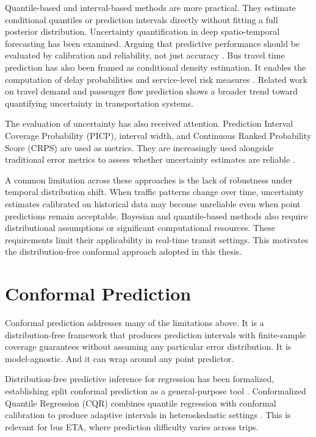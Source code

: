 \documentclass[12pt, a4paper, oneside]{report}
\begin{document}
Quantile-based and interval-based methods are more practical. They estimate conditional quantiles or prediction intervals directly without fitting a full posterior distribution. Uncertainty quantification in deep spatio-temporal forecasting has been examined. Arguing that predictive performance should be evaluated by calibration and reliability, not just accuracy \cite{Wu20211841}. Bus travel time prediction has also been framed as conditional density estimation. It enables the computation of delay probabilities and service-level risk measures \cite{Ricard2022}. Related work on travel demand \cite{Peng2025} and passenger flow prediction \cite{Mu2025118} shows a broader trend toward quantifying uncertainty in transportation systems.

The evaluation of uncertainty has also received attention. Prediction Interval Coverage Probability (PICP), interval width, and Continuous Ranked Probability Score (CRPS) are used as metrics. They are increasingly used alongside traditional error metrics to assess whether uncertainty estimates are reliable \cite{Wu20211841, Zhang2024139789}.

A common limitation across these approaches is the lack of robustness under temporal distribution shift. When traffic patterns change over time, uncertainty estimates calibrated on historical data may become unreliable even when point predictions remain acceptable. Bayesian and quantile-based methods also require distributional assumptions or significant computational resources. These requirements limit their applicability in real-time transit settings. This motivates the distribution-free conformal approach adopted in this thesis.

\section{Conformal Prediction}

Conformal prediction addresses many of the limitations above. It is a distribution-free framework that produces prediction intervals with finite-sample coverage guarantees without assuming any particular error distribution. It is model-agnostic. And it can wrap around any point predictor.

Distribution-free predictive inference for regression has been formalized, establishing split conformal prediction as a general-purpose tool \cite{Lei20181094}. Conformalized Quantile Regression (CQR) combines quantile regression with conformal calibration to produce adaptive intervals in heteroskedastic settings \cite{Romano2019}. This is relevant for bus ETA, where prediction difficulty varies across trips.
\end{document}
